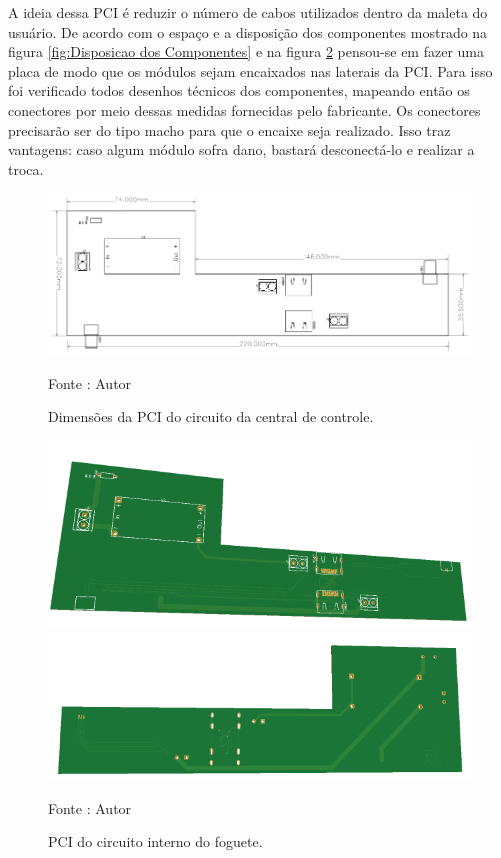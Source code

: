 A ideia dessa PCI é reduzir o número de cabos utilizados dentro da maleta do usuário.
De acordo com o espaço e a disposição dos componentes mostrado na figura  \ref{fig:Disposicao dos Componentes} e na figura \ref{fig:PCB_controle} pensou-se em fazer uma placa de modo que os módulos sejam encaixados nas laterais da PCI. Para isso foi verificado todos desenhos técnicos dos componentes, mapeando então os conectores  por meio dessas medidas fornecidas pelo fabricante. Os conectores precisarão ser do tipo macho para que o encaixe seja realizado. Isso traz vantagens: caso algum módulo sofra dano, bastará  desconectá-lo e realizar a troca.

\begin{figure}[H]
  \centering
  \includegraphics[scale=0.5]{figuras/PCB_Maleta.png}
  \caption{ Dimensões da PCI do circuito da central de controle.} 
  {\footnotesize Fonte : Autor } 
  \label{fig:PCIMaleta}
\end{figure}

\begin{figure}[H]
  \centering
  \includegraphics[scale=0.4]{figuras/pcicontrole-top.png}
    \includegraphics[scale=0.4]{figuras/pcicontrole-bo.png}
  \caption{PCI do circuito interno do foguete. } 
  {\footnotesize Fonte : Autor } 
  \label{fig:PCB_controle}
\end{figure}
